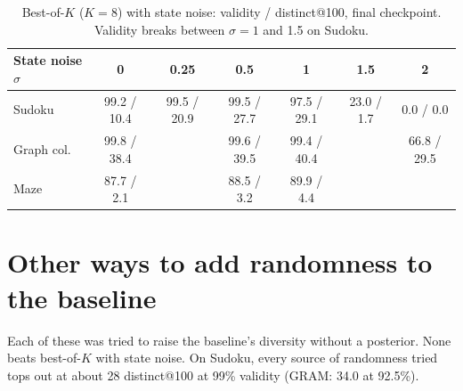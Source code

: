 \documentclass[11pt]{article}
\newcommand{\bok}{best-of-$K$}
\newcommand{\Bok}{Best-of-$K$}
\begin{document}
\begin{table}[h]
\centering\small
\begin{tabular}{@{}lcccccc@{}}
\toprule
State noise $\sigma$ & 0 & 0.25 & 0.5 & 1 & 1.5 & 2 \\
\midrule
Sudoku & 99.2 / 10.4 & 99.5 / 20.9 & 99.5 / 27.7 & 97.5 / 29.1 & 23.0 / 1.7 & 0.0 / 0.0 \\
Graph col. & 99.8 / 38.4 & & 99.6 / 39.5 & 99.4 / 40.4 & & 66.8 / 29.5 \\
Maze & 87.7 / 2.1 & & 88.5 / 3.2 & 89.9 / 4.4 & & \\
\bottomrule
\end{tabular}
\caption{\Bok{} ($K=8$) with state noise: validity / distinct@100, final checkpoint. Validity breaks between
$\sigma=1$ and 1.5 on Sudoku.}
\end{table}

\section{Other ways to add randomness to the baseline}

Each of these was tried to raise the baseline's diversity without a posterior. None beats \bok{} with state noise.
On Sudoku, every source of randomness tried tops out at about 28 distinct@100 at 99\% validity (GRAM: 34.0 at 92.5\%).

\begin{table}[h]
\centering\small
{}
\caption{Validity / unique-solution validity / distinct@100 (state-noise rows: validity / distinct@100). Blank: not
run. STRM on graph colouring was unstable across checkpoints.}
\end{table}
\end{document}
